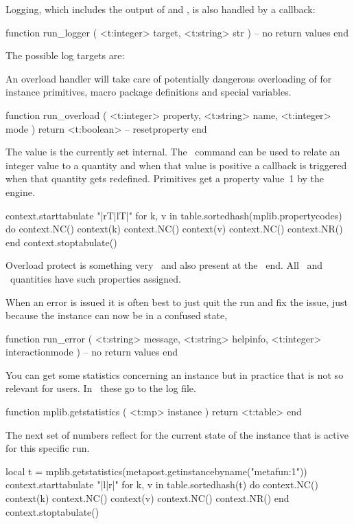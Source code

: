 Logging, which includes the output of  and , is also
handled by a callback:

\starttyping[option=LUA]
function run_logger ( <t:integer> target, <t:string> str )
    -- no return values
end
\stoptyping

The possible log targets are:


An overload handler will take care of potentially dangerous overloading of for
instance primitives, macro package definitions and special variables.

\starttyping[option=LUA]
function run_overload ( <t:integer> property, <t:string> name, <t:integer> mode )
    return <t:boolean> -- resetproperty
end
\stoptyping

The  value is the currently set 
internal. The \METAPOST\ command  can be used to
relate an integer value to a quantity and when that value is positive a callback
is triggered when that quantity gets redefined. Primitives get a property value~1
by the engine.

\startluacode
context.starttabulate { "|rT|lT|" }
for k, v in table.sortedhash(mplib.propertycodes) do
    context.NC() context(k)
    context.NC() context(v)
    context.NC() context.NR()
end
context.stoptabulate()
\stopluacode

Overload protect is something very \CONTEXT\ and also present at the \TEX\ end.
All \TEX\ and \METAPOST\ quantities have such properties assigned.

When an error is issued it is often best to just quit the run and fix the issue,
just because the instance can now be in a confused state,

\starttyping[option=LUA]
function run_error (
    <t:string>  message,
    <t:string>  helpinfo,
    <t:integer> interactionmode
)
    -- no return values
end
\stoptyping

You can get some statistics concerning an instance but in practice that is not so
relevant for users. In \CONTEXT\ these go to the log file.

\starttyping[option=LUA]
function mplib.getstatistics ( <t:mp> instance )
    return <t:table>
end
\stoptyping

The next set of numbers reflect for the current state of the 
instance that is active for this specific run.

\startthreerows
\startluacode
local t = mplib.getstatistics(metapost.getinstancebyname("metafun:1"))
context.starttabulate { "|l|r|" }
    for k, v in table.sortedhash(t) do
        context.NC() context(k)
        context.NC() context(v)
        context.NC() context.NR()
    end
context.stoptabulate()
\stopluacode
\stopthreerows

